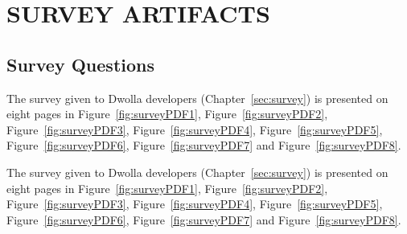 \chapter{SURVEY ARTIFACTS}

\section*{Survey Questions}
\label{app:surveyQuestions}
The survey given to Dwolla developers (Chapter~\ref{sec:survey}) is presented on eight pages in Figure~\ref{fig:surveyPDF1}, Figure~\ref{fig:surveyPDF2}, Figure~\ref{fig:surveyPDF3}, Figure~\ref{fig:surveyPDF4}, Figure~\ref{fig:surveyPDF5}, Figure~\ref{fig:surveyPDF6}, Figure~\ref{fig:surveyPDF7} and  Figure~\ref{fig:surveyPDF8}.

The survey given to Dwolla developers (Chapter~\ref{sec:survey}) is presented on eight pages in Figure~\ref{fig:surveyPDF1}, Figure~\ref{fig:surveyPDF2}, Figure~\ref{fig:surveyPDF3}, Figure~\ref{fig:surveyPDF4}, Figure~\ref{fig:surveyPDF5}, Figure~\ref{fig:surveyPDF6}, Figure~\ref{fig:surveyPDF7} and  Figure~\ref{fig:surveyPDF8}.


